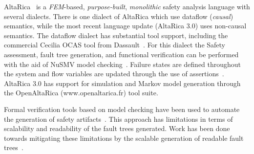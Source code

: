 AltaRica~\cite{PROSVIRNOVA2013127,BieberERTS2018} is a {\em FEM}-based, {\em purpose-built}, {\em monolithic} safety analysis language with several dialects.  There is one dialect of AltaRica which use dataflow ({\em causal}) semantics, while the most recent language update (AltaRica 3.0) uses non-causal semantics.  The dataflow dialect has substantial tool support, including the commercial Cecilia OCAS tool from Dassault~\cite{bieber2004safety}.  For this dialect the Safety assessment, fault tree generation, and functional verification can be performed with the aid of NuSMV model checking~\cite{symbAltaRica}. Failure states are defined throughout the system and flow variables are updated through the use of assertions~\cite{Bieber04safetyassessment}.  AltaRica 3.0 has support for simulation and Markov model generation through the OpenAltaRica (www.openaltarica.fr) tool suite.

Formal verification tools based on model checking have been used to automate the generation of safety artifacts~\cite{symbAltaRica,10.1007/978-3-540-75596-8-13, DBLP:conf/tacas/BittnerBCCGGMMZ16}. This approach has limitations in terms of scalability and readability of the fault trees generated. Work has been done towards mitigating these limitations by the scalable generation of readable fault trees~\cite{10.1007/978-3-319-11936-6-7}.




